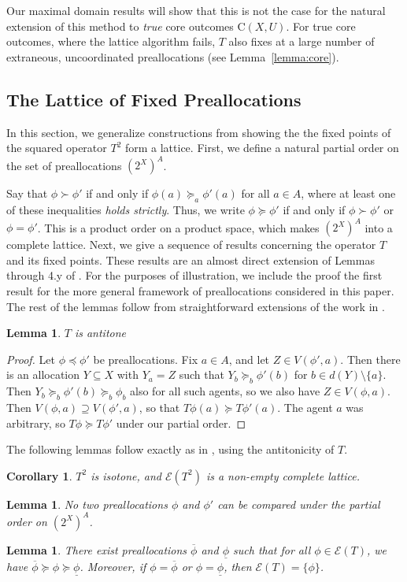 \documentclass[11pt,reqno]{amsart}
\newtheorem{lemma}[thm]{Lemma}
\newtheorem{cor}[thm]{Corollary}
\theoremstyle{definition}
\numberwithin{equation}{section}
\newcommand{\prf}{\begin{proof}}
\newcommand{\eprf}{\end{proof}}
\newcommand{\ol}{\overline}
\newcommand{\ul}{\underline}
\newcommand{\pre}{\phi}
\newcommand{\prealloc}{(2^X)^A}
\newcommand{\sub}{\subseteq}
\newcommand{\core}{\mathrm{C}(X,U)}
\newcommand{\fix}{\mathcal{E}}
\newcommand{\suq}{\succeq}
\newcommand{\peq}{\preceq}
\newcommand{\su}{\succ}
\begin{document}
Our maximal domain results will show that this is not the case for the natural extension of this method to \emph{true} core outcomes $\core$.
For true core outcomes, where the lattice algorithm fails, $T$ also fixes at a large number of extraneous, uncoordinated preallocations (see Lemma~\ref{lemma:core}). 

\subsection{The Lattice of Fixed Preallocations}
In this section, we generalize constructions from \cite{EcheniqueYenmez2013} showing the the fixed points of the squared operator $T^2$ form a lattice. 
First, we define a natural partial order on the set of preallocations $\prealloc$.

Say that $\pre \su \pre'$ if and only if $\pre(a) \suq_a \pre'(a)$ for all $a \in A$, where at least one of these inequalities \emph{holds strictly}. 
Thus, we write $\pre \suq \pre'$ if and only if $\pre \su \pre'$ or $\pre = \pre'$. 
This is a product order on a product space, which makes $\prealloc$ into a complete lattice. 
Next, we give a sequence of results concerning the operator $T$ and its fixed points. 
These results are an almost direct extension of Lemmas through 4.y of \cite{EcheniqueYenmez2013}.
For the purposes of illustration, we include the proof the first result for the more general framework of preallocations considered in this paper.
The rest of the lemmas follow from straightforward extensions of the work in \cite{EcheniqueYenmez2013}. 
\begin{lemma} \label{lemma:antitone}
$T$ is antitone 
\end{lemma}
\prf
Let $\pre \peq \pre'$ be preallocations.
Fix $a \in A$, and let $Z \in V(\pre',a)$.
Then there is an allocation $Y \sub X$ with $Y_a = Z$ such that $Y_b \suq_b \pre'(b)$ for $b \in d(Y) \setminus \{a\}$.
Then $Y_b \suq_b \pre'(b) \suq_b \pre_b$ also for all such agents, so we also have $Z \in V(\pre,a)$.
Then $V(\pre,a) \supseteq V(\pre',a)$, so that $T\pre(a) \suq T\pre'(a)$. The agent $a$ was arbitrary, so $T\pre \suq T\pre'$ under our partial order. 
\eprf
The following lemmas follow exactly as in \cite{EcheniqueYenmez2013}, using the antitonicity of $T$. 
\begin{cor} $T^2$ is isotone, and $\fix(T^2)$ is a non-empty complete lattice. 
\end{cor}
\begin{lemma} \label{lemma:order}
No two preallocations $\pre$ and $\pre'$ can be compared under the partial order on $\prealloc$.
\end{lemma}
\begin{lemma} \label{lemma:top}
There exist preallocations $\ol{\pre}$ and $\ul{\pre}$ such that for all $\pre \in \fix(T)$, we have $\ol{\pre} \suq \pre \suq \ul{\pre}$. Moreover, if $\pre = \ol{\pre}$ or $\pre = \ul{\pre}$, then $\fix(T) = \{\pre\}$. 
\end{lemma}
\end{document}
